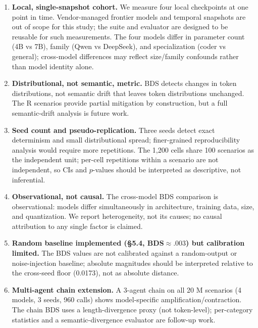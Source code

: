 \documentclass[11pt]{article}
\begin{document}
\begin{enumerate}[nosep]
  \item \textbf{Local, single-snapshot cohort.} We measure four local
        checkpoints at one point in time. Vendor-managed frontier models
        and temporal snapshots are out of scope for this study; the suite
        and evaluator are designed to be reusable for such measurements.
        The four models differ in parameter count (4B vs 7B), family
        (Qwen vs DeepSeek), and specialization (coder vs general);
        cross-model differences may reflect size/family confounds rather
        than model identity alone.
  \item \textbf{Distributional, not semantic, metric.} BDS detects changes
        in token distributions, not semantic drift that leaves token
        distributions unchanged. The \textsc{R} scenarios provide partial
        mitigation by construction, but a full semantic-drift analysis is
        future work.
  \item \textbf{Seed count and pseudo-replication.} Three seeds detect
        exact determinism and small distributional spread; finer-grained
        reproducibility analysis would require more repetitions. The
        1,200 cells share 100 scenarios as the independent unit; per-cell
        repetitions within a scenario are not independent, so CIs and
        $p$-values should be interpreted as descriptive, not inferential.
  \item \textbf{Observational, not causal.} The cross-model BDS
        comparison is observational: models differ simultaneously in
        architecture, training data, size, and quantization. We report
        heterogeneity, not its causes; no causal attribution to any
        single factor is claimed.
  \item \textbf{Random baseline implemented (\S5.4, BDS$\approx.003$) but calibration limited.} The BDS values are not calibrated
        against a random-output or noise-injection baseline; absolute
        magnitudes should be interpreted relative to the cross-seed
        floor (0.0173), not as absolute distance.
  \item \textbf{Multi-agent chain extension.} A 3-agent chain on all 20
        \textsc{M} scenarios (4 models, 3 seeds, 960 calls) shows
        model-specific amplification/contraction. The chain BDS uses a
        length-divergence proxy (not token-level); per-category
        statistics and a semantic-divergence evaluator are follow-up work.
\end{enumerate}
\end{document}

